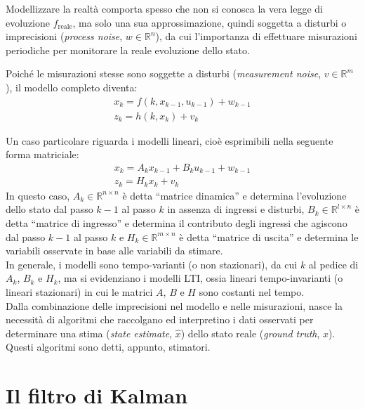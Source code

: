 \documentclass[12pt,a4paper,openright,twoside]{book}
\begin{document}
Modellizzare la realtà comporta spesso che non si conosca la vera legge di evoluzione $f_\text{reale}$, ma solo una sua approssimazione, quindi soggetta a disturbi o imprecisioni (\textit{process noise}, $w\in\mathbb{R}^n$), da cui l'importanza di effettuare misurazioni periodiche per monitorare la reale evoluzione dello stato.

Poiché le misurazioni stesse sono soggette a disturbi (\textit{measurement noise}, $v\in\mathbb{R}^m$), il modello completo diventa:
\begin{gather}
x_k=f(k,x_{k-1},u_{k-1})+w_{k-1}\label{eq:fdet} \\
z_k=h(k,x_k)+v_k\label{eq:hdet}
\end{gather}

Un caso particolare riguarda i modelli lineari, cioè esprimibili nella seguente forma matriciale:
\begin{gather}
x_k=A_kx_{k-1}+B_ku_{k-1}+w_{k-1} \label{eq:transition}\\
z_k=H_kx_k+v_k \label{eq:output}
\end{gather}
In questo caso, $A_k\in\mathbb{R}^{n\times n}$ è detta ``matrice dinamica'' e determina l'evoluzione dello stato dal passo $k-1$ al passo $k$ in assenza di ingressi e disturbi, $B_k\in\mathbb{R}^{l\times n}$ è detta ``matrice di ingresso'' e determina il contributo degli ingressi che agiscono dal passo $k-1$ al passo $k$ e $H_k\in\mathbb{R}^{m\times n}$ è detta ``matrice di uscita'' e determina le variabili osservate in base alle variabili da stimare. \\

In generale, i modelli sono tempo-varianti (o non stazionari), da cui $k$ al pedice di $A_k$, $B_k$ e $H_k$, ma si evidenziano i modelli LTI, ossia lineari tempo-invarianti (o lineari stazionari) in cui le matrici $A$, $B$ e $H$ sono costanti nel tempo. \\

Dalla combinazione delle imprecisioni nel modello e nelle misurazioni, nasce la necessità di algoritmi che raccolgano ed interpretino i dati osservati per determinare una stima (\textit{state estimate}, $\hat{x}$) dello stato reale (\textit{ground truth}, $x$). Questi algoritmi sono detti, appunto, stimatori.

\section{Il filtro di Kalman}
\end{document}
